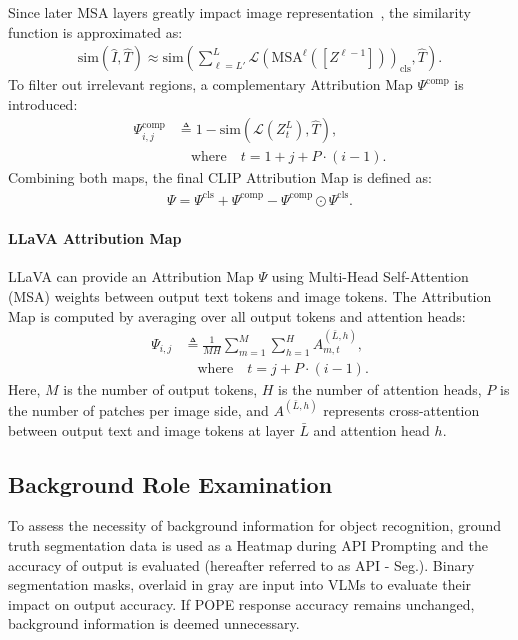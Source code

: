 Since later MSA layers greatly impact image representation~\citep{clipdec}, the similarity function is approximated as:
\begin{equation}
   \begin{aligned}
\text{sim}(\hat{I}, \hat{T}) \approx \text{sim}\left(\sum_
{\ell=L'}^{L} \mathcal{L}(\text{MSA}^{\ell}([Z^{\ell-1}]))_{\text{cls}}, \hat{T}\right).
\end{aligned}
\end{equation}
To filter out irrelevant regions, a complementary Attribution Map \( \Psi^{\text{comp}} \) is introduced:
\begin{equation}
   \begin{aligned}
   \Psi_{i,j}^{\text{comp}} &\triangleq 1 - \text{sim}(\mathcal{L}(Z_{t}^{L}), \hat{T}), \\
&\quad \text{where} \quad t = 1 + j + P \cdot (i - 1).
\end{aligned}
\end{equation}
Combining both maps, the final CLIP Attribution Map is defined as:
\begin{equation}
   \begin{aligned}
   \Psi = \Psi^{\text{cls}} + \Psi^{\text{comp}} - \Psi^{\text{comp}} \odot \Psi^{\text{cls}}.
\end{aligned}
\end{equation}

\paragraph{LLaVA Attribution Map}
LLaVA can provide an Attribution Map \( \Psi \) using Multi-Head Self-Attention (MSA) weights between output text tokens and image tokens. The Attribution Map is computed by averaging over all output tokens and attention heads:
\begin{equation}
   \begin{aligned}
\Psi_{i,j} &\triangleq \frac{1}{MH} 
  \sum_{m=1}^{M} 
  \sum_{h=1}^{H} 
  A_{m,t}^{(\bar{L},h)}, \\
&\quad \text{where} \quad 
t = j + P \cdot (i - 1).
\end{aligned}
\end{equation}
Here, \(M\) is the number of output tokens, \(H\) is the number of attention heads, \(P\) is the number of patches per image side, and \(A^{(\bar{L},h)}\) represents cross-attention between output text and image tokens at layer \(\bar{L}\) and attention head \(h\).

\subsection{Background Role Examination}
To assess the necessity of background information for object recognition, ground truth segmentation data is used as a Heatmap during API Prompting and the accuracy of output is evaluated (hereafter referred to as API - Seg.). Binary segmentation masks, overlaid in gray are input into VLMs to evaluate their impact on output accuracy. If POPE response accuracy remains unchanged, background information is deemed unnecessary.

